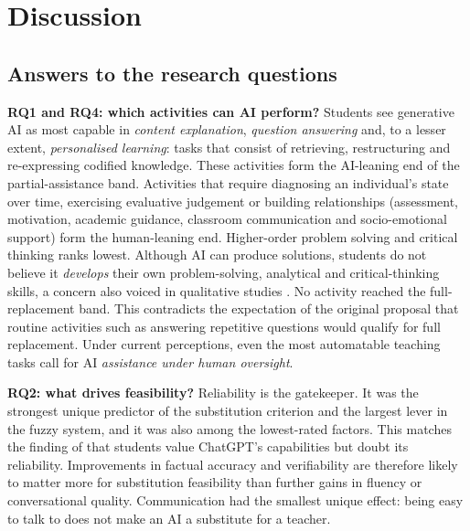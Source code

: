 \documentclass[pdflatex,sn-basic]{sn-jnl}%
\theoremstyle{plain}
\theoremstyle{remark}
\begin{document}


\section{Discussion}
\label{sec:discussion}

\subsection{Answers to the research questions}
\textbf{RQ1 and RQ4: which activities can AI perform?} Students see generative AI as most capable in \emph{content explanation}, \emph{question answering} and, to a lesser extent, \emph{personalised learning}: tasks that consist of retrieving, restructuring and re-expressing codified knowledge. These activities form the AI-leaning end of the partial-assistance band. Activities that require diagnosing an individual's state over time, exercising evaluative judgement or building relationships (assessment, motivation, academic guidance, classroom communication and socio-emotional support) form the human-leaning end. Higher-order problem solving and critical thinking ranks lowest. Although AI can produce solutions, students do not believe it \emph{develops} their own problem-solving, analytical and critical-thinking skills, a concern also voiced in qualitative studies \citep{chantsi2024,chanhu2023}. No activity reached the full-replacement band. This contradicts the expectation of the original proposal that routine activities such as answering repetitive questions would qualify for full replacement. Under current perceptions, even the most automatable teaching tasks call for AI \emph{assistance under human oversight}.

\textbf{RQ2: what drives feasibility?} Reliability is the gatekeeper. It was the strongest unique predictor of the substitution criterion and the largest lever in the fuzzy system, and it was also among the lowest-rated factors. This matches the finding of \citet{ravselj2025} that students value ChatGPT's capabilities but doubt its reliability. Improvements in factual accuracy and verifiability are therefore likely to matter more for substitution feasibility than further gains in fluency or conversational quality. Communication had the smallest unique effect: being easy to talk to does not make an AI a substitute for a teacher.
\end{document}
